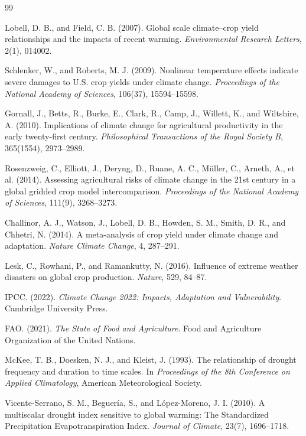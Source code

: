 \documentclass[12pt,a4paper]{article}
\begin{document}
\newpage
\begin{thebibliography}{99}

Lobell, D. B., and Field, C. B. (2007).
Global scale climate--crop yield relationships and the impacts of recent warming.
\textit{Environmental Research Letters}, 2(1), 014002.

Schlenker, W., and Roberts, M. J. (2009).
Nonlinear temperature effects indicate severe damages to U.S. crop yields under climate change.
\textit{Proceedings of the National Academy of Sciences}, 106(37), 15594--15598.

Gornall, J., Betts, R., Burke, E., Clark, R., Camp, J., Willett, K., and Wiltshire, A. (2010).
Implications of climate change for agricultural productivity in the early twenty-first century.
\textit{Philosophical Transactions of the Royal Society B}, 365(1554), 2973--2989.

Rosenzweig, C., Elliott, J., Deryng, D., Ruane, A. C., M{\"u}ller, C., Arneth, A., et al. (2014).
Assessing agricultural risks of climate change in the 21st century in a global gridded crop model intercomparison.
\textit{Proceedings of the National Academy of Sciences}, 111(9), 3268--3273.

Challinor, A. J., Watson, J., Lobell, D. B., Howden, S. M., Smith, D. R., and Chhetri, N. (2014).
A meta-analysis of crop yield under climate change and adaptation.
\textit{Nature Climate Change}, 4, 287--291.

Lesk, C., Rowhani, P., and Ramankutty, N. (2016).
Influence of extreme weather disasters on global crop production.
\textit{Nature}, 529, 84--87.

IPCC. (2022).
\textit{Climate Change 2022: Impacts, Adaptation and Vulnerability}.
Cambridge University Press.

FAO. (2021).
\textit{The State of Food and Agriculture}.
Food and Agriculture Organization of the United Nations.

McKee, T. B., Doesken, N. J., and Kleist, J. (1993).
The relationship of drought frequency and duration to time scales.
In \textit{Proceedings of the 8th Conference on Applied Climatology}, American Meteorological Society.

Vicente-Serrano, S. M., Beguer{\'i}a, S., and L{\'o}pez-Moreno, J. I. (2010).
A multiscalar drought index sensitive to global warming: The Standardized Precipitation Evapotranspiration Index.
\textit{Journal of Climate}, 23(7), 1696--1718.


\end{thebibliography}
\end{document}
